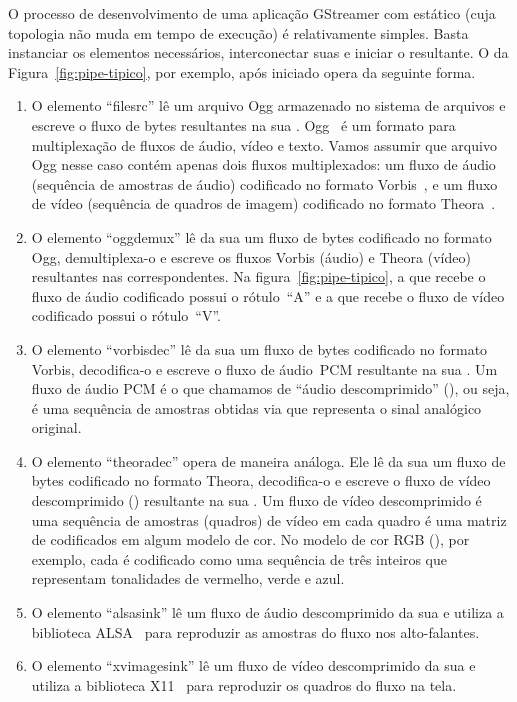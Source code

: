 \documentclass{SBCbookchapter}
\begin{document}
O processo de desenvolvimento de uma aplicação GStreamer com 
estático (cuja topologia não muda em tempo de execução) é relativamente
simples.  Basta instanciar os elementos necessários, interconectar suas
 e iniciar o  resultante.  O  da
Figura~\ref{fig:pipe-tipico}, por exemplo, após iniciado opera da seguinte
forma.
\begin{enumerate}
\item O elemento ``filesrc'' lê um arquivo Ogg armazenado no sistema de
  arquivos e escreve o fluxo de bytes resultantes na sua .
  Ogg~\cite{ogg-rfc-3533} é um formato para multiplexação de fluxos de
  áudio, vídeo e texto.  Vamos assumir que arquivo Ogg nesse caso contém
  apenas dois fluxos multiplexados: um fluxo de áudio (sequência de amostras
  de áudio) codificado no formato Vorbis~\cite{vorbis}, e um fluxo de vídeo
  (sequência de quadros de imagem) codificado no formato
  Theora~\cite{theora}.
\item O elemento ``oggdemux'' lê da sua  um fluxo de bytes
  codificado no formato Ogg, demultiplexa-o e escreve os fluxos Vorbis
  (áudio) e Theora (vídeo) resultantes nas  correspondentes.
  Na figura~\ref{fig:pipe-tipico}, a  que recebe o fluxo
  de áudio codificado possui o rótulo~``A'' e a  que recebe o
  fluxo de vídeo codificado possui o rótulo~``V''.
\item O elemento ``vorbisdec'' lê da sua  um fluxo de bytes
  codificado no formato Vorbis, decodifica-o e escreve o fluxo de áudio~PCM
  resultante na sua .  Um fluxo de áudio PCM é o que chamamos
  de ``áudio descomprimido'' (), ou seja, é uma sequência de
  amostras obtidas via  que representa o sinal
  analógico original.
\item O elemento ``theoradec'' opera de maneira análoga.  Ele lê da sua
   um fluxo de bytes codificado no formato Theora, decodifica-o
  e escreve o fluxo de vídeo descomprimido () resultante na sua
  .  Um fluxo de vídeo descomprimido é uma sequência de
  amostras (quadros) de vídeo em cada quadro é uma matriz de 
  codificados em algum modelo de cor.  No modelo de cor RGB
  (), por exemplo, cada  é codificado como uma
  sequência de três inteiros que representam tonalidades de vermelho, verde
  e azul.
\item O elemento ``alsasink'' lê um fluxo de áudio descomprimido da sua
   e utiliza a biblioteca ALSA~\cite{alsa} para reproduzir as
  amostras do fluxo nos alto-falantes.
\item O elemento ``xvimagesink'' lê um fluxo de vídeo descomprimido da sua
   e utiliza a biblioteca X11~\cite{x11} para reproduzir os
  quadros do fluxo na tela.
\end{enumerate}
\end{document}

